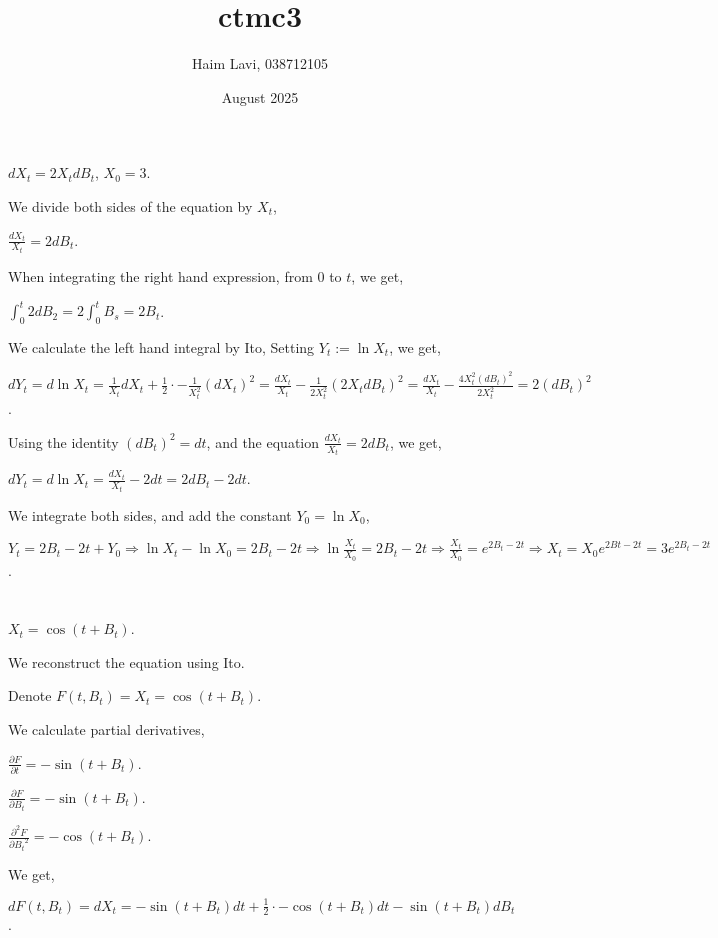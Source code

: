 \documentclass{article}
\title{ctmc3}
\author{Haim Lavi, 038712105}
\date{August 2025}
\begin{document}
\maketitle

\section{}
$dX_t=2X_tdB_t$, $X_0=3$.

We divide both sides of the equation by $X_t$,

$\frac{dX_t}{X_t}=2dB_t$.

When integrating the right hand expression, from $0$ to $t$, we get,

$\int_0^t{2dB_2}=2\int_0^t{B_s}=2B_t$.

We calculate the left hand integral by Ito,
Setting $Y_t:=\ln{X_t}$, we get,

$dY_t=d\ln{X_t}=\frac{1}{X_t}dX_t+\frac{1}{2}\cdot-\frac{1}{X_t^2}(dX_t)^2=\frac{dX_t}{X_t}-\frac{1}{2X_t^2}(2X_tdB_t)^2=\frac{dX_t}{X_t}-\frac{4X_t^2(dB_t)^2}{2X_t^2}=2(dB_t)^2$.

Using the identity $(dB_t)^2=dt$, and the equation $\frac{dX_t}{X_t}=2dB_t$, we get,

$dY_t=d\ln{X_t}=\frac{dX_t}{X_t}-2dt=2dB_t-2dt$.

We integrate both sides, and add the constant $Y_0=\ln{X_0}$,

$Y_t=2B_t-2t+Y_0\Rightarrow{\ln{X_t}-\ln{X_0}=2B_t-2t}\Rightarrow\ln\frac{X_t}{X_0}=2B_t-2t\Rightarrow\frac{X_t}{X_0}=e^{2B_t-2t}\Rightarrow{X_t=X_0e^{2Bt-2t}}=3e^{2B_t-2t}$.
\section{}
$X_t=\cos(t+B_t)$.

We reconstruct the equation using Ito.

Denote $F(t,B_t)=X_t=\cos(t+B_t)$.

We calculate partial derivatives,

$\frac{\partial{F}}{\partial{t}}=-\sin(t+B_t)$.

$\frac{\partial{F}}{\partial{B_t}}=-\sin(t+B_t)$.

$\frac{\partial^2{F}}{\partial{B_t}^2}=-\cos(t+B_t)$.

We get,

$dF(t,B_t)=dX_t=-\sin(t+B_t)dt+\frac{1}{2}\cdot-\cos(t+B_t)dt-\sin(t+B_t)dB_t$.
\end{document}
